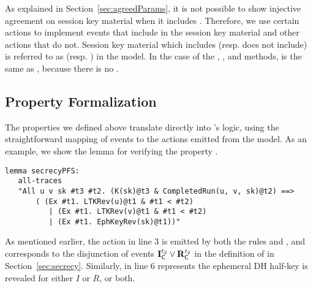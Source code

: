 As explained in Section~\ref{sec:agreedParams}, it is not possible to show
injective agreement on session key material when it includes \mGiy.
%
Therefore, we use certain actions to implement events that include \mGiy{} in the
session key material and other actions that do not.
%
Session key material which includes (resp. does not include) \mGiy{} is referred to as  (resp. ) in the
\mTamarin{} model. %
%
In the case of the \mSigSig, \mSigStat{}, and \mPskPsk{} methods, 
is the same as , because there is no \mGiy.%
%



\subsection{Property Formalization}
\label{sec:propertyFormalization}
The properties we defined above translate directly into \mTamarin's logic,
using the straightforward mapping of events to the actions emitted from the model.
%
As an example, we show the lemma for verifying the property \mPredPfs.
%
\begin{lstlisting}
lemma secrecyPFS:
   all-traces
   "All u v sk #t3 #t2. (K(sk)@t3 & CompletedRun(u, v, sk)@t2) ==>
       ( (Ex #t1. LTKRev(u)@t1 & #t1 < #t2)
          | (Ex #t1. LTKRev(v)@t1 & #t1 < #t2)
          | (Ex #t1. EphKeyRev(sk)@t1))"
\end{lstlisting}
%
As mentioned earlier, the action  in line 3 is
emitted by both the rules  and , and corresponds
to the disjunction of events $\mathbf{I}_{\textsf{C}}^{t_2} \lor \mathbf{R}_{\textsf{C}}^{t_2}$ in the
definition of \mPredPfs{} in Section~\ref{sec:secrecy}.
%
Similarly,  in line 6 represents the ephemeral
DH half-key is revealed for either $I$ or $R$, or both.
%

